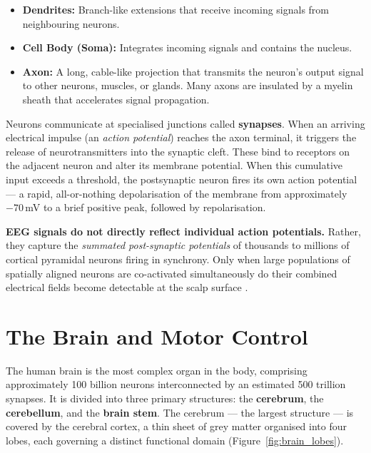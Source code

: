 \documentclass[12pt, a4paper, oneside]{report}
\begin{document}
\begin{itemize}
  \item \textbf{Dendrites:} Branch-like extensions that receive incoming signals
        from neighbouring neurons.
  \item \textbf{Cell Body (Soma):} Integrates incoming signals and contains the
        nucleus.
  \item \textbf{Axon:} A long, cable-like projection that transmits the neuron's
        output signal to other neurons, muscles, or glands. Many axons are
        insulated by a myelin sheath that accelerates signal propagation.
\end{itemize}

Neurons communicate at specialised junctions called \textbf{synapses}. When an
arriving electrical impulse (an \textit{action potential}) reaches the axon
terminal, it triggers the release of neurotransmitters into the synaptic cleft.
These bind to receptors on the adjacent neuron and alter its membrane potential.
When this cumulative input exceeds a threshold, the postsynaptic neuron fires its
own action potential --- a rapid, all-or-nothing depolarisation of the membrane from
approximately $-70$\,mV to a brief positive peak, followed by repolarisation.

\textbf{EEG signals do not directly reflect individual action potentials.} Rather,
they capture the \textit{summated post-synaptic potentials} of thousands to millions
of cortical pyramidal neurons firing in synchrony. Only when large populations of
spatially aligned neurons are co-activated simultaneously do their combined
electrical fields become detectable at the scalp surface \cite{nunez2006}.

\section{The Brain and Motor Control}

The human brain is the most complex organ in the body, comprising approximately
100 billion neurons interconnected by an estimated 500 trillion synapses. It is
divided into three primary structures: the \textbf{cerebrum}, the
\textbf{cerebellum}, and the \textbf{brain stem}. The cerebrum --- the largest
structure --- is covered by the cerebral cortex, a thin sheet of grey matter
organised into four lobes, each governing a distinct functional domain
(Figure~\ref{fig:brain_lobes}).
\end{document}
